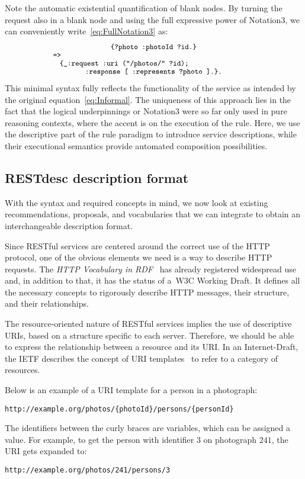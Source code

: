 \documentclass[smallextended]{svjour3}
\begin{document}
{Note the automatic existential quantification of blank nodes. By turning the request also in a blank node and using the full expressive power of Notation3, we can conveniently write~\ref{eq:FullNotation3} as:
\begin{multline}\label{eq:Notation3}
    \makebox[6.6cm]{\fontsize{9}{11}\texttt{\{?photo :photoId ?id.\}}}\\[-.5em]
    \fontsize{9}{11}\texttt{=>}\makebox[8.2cm]{}\\[-.5em]
    \fontsize{9}{11}\texttt{\{\_:request :uri ("/photos/" ?id);}\makebox[2.5cm]{}\\[-.5em]
    \makebox[8.35cm]{\fontsize{9}{11}\texttt{:response [ :represents ?photo ].\}.}}
\end{multline}
This minimal syntax fully reflects the functionality of the service as intended by the original equation~\ref{eq:Informal}.
The uniqueness of this approach lies in the fact that the logical underpinnings or Notation3 were so far only used in pure reasoning contexts, where the accent is on the execution of the rule.
Here, we use the descriptive part of the rule paradigm to introduce service descriptions, while their executional semantics provide automated composition possibilities.

\subsection{RESTdesc description format}
With the syntax and required concepts in mind, we now look at existing recommendations, proposals, and vocabularies that we can integrate to obtain an interchangeable description format.

Since RESTful services are centered around the correct use of the HTTP protocol, one of the obvious elements we need is a way to describe HTTP requests. The \emph{HTTP Vocabulary in RDF}~\cite{HTTPinRDF} has already registered widespread use and, in addition to that, it has the status of a~W3C Working Draft. It defines all the necessary concepts to rigorously describe HTTP messages, their structure, and their relationships.

The resource-oriented nature of RESTful services implies the use of descriptive URIs, based on a structure specific to each server. Therefore, we should be able to express the relationship between a resource and its URI. In an Internet-Draft, the IETF describes the concept of URI templates~\cite{URITemplate} to refer to a category of resources.

\needspace{2em} Below is an example of a URI template for a person in a photograph:
\begin{Verbatim}
http://example.org/photos/{photoId}/persons/{personId}
\end{Verbatim}
The identifiers between the curly braces are variables, which can be assigned a value. For example, to get the person with identifier $3$ on photograph $241$, the URI gets expanded to:
\begin{Verbatim}
http://example.org/photos/241/persons/3
\end{Verbatim}

}
\end{document}
